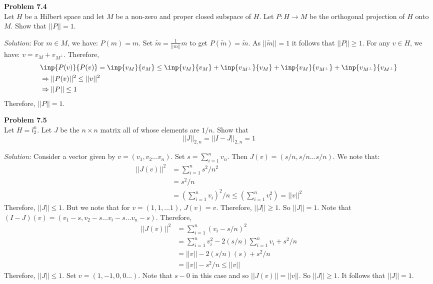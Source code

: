\documentclass[a4paper, 11pt]{article}
\newenvironment{problem}[2][Problem]
    { \begin{mdframed}[backgroundcolor=gray!20] \textbf{#1 #2} \\}
    {  \end{mdframed}}
\newenvironment{solution}
    {\textit{Solution:}}
    {}
\begin{document}
\begin{problem}{7.4}
    Let $H$ be a Hilbert space and let $M$ be a non-zero and proper closed subspace of $H$. Let $P:H\to M$ be the orthogonal projection of $H$ onto $M$. Show that $||P||=1$.
\end{problem}
\begin{solution}
    For $m\in M$, we have: $P(m)=m$. Set $\tilde m=\frac{1}{||m||}m$ to get $P(\tilde m)=\tilde m$. As $||\tilde m||=1$ it follows that $||P||\geq 1$. For any $v\in H$, we have: $v=v_{M}+v_{M^{\bot}}$. Therefore,
    \begin{align*}
        &\inp{P(v)}{P(v)}=\inp{v_M}{v_M}\leq\inp{v_M}{v_M}+\inp{v_{M^{\bot}}}{v_M}+\inp{v_{M}}{v_{M^\bot}}+\inp{v_{M^\bot}}{v_{M^\bot}}\\
        &\Rightarrow||P(v)||^2\leq ||v||^2\\
        &\Rightarrow||P||\leq 1
    \end{align*}
    Therefore, $||P||=1$. 
\end{solution}

\begin{problem}{7.5}
    Let $H=l_2^n$. Let $J$ be the $n\times n$ matrix all of whose elements are $1/n$. Show that 
    $$||J||_{2,n}=||I-J||_{2,n}=1$$
\end{problem}
\begin{solution}
 Consider a vector given by $v=(v_1,v_2\hdots v_n)$. Set $s=\sum_{i=1}^{n}v_n$. Then $J(v)=(s/n,s/n\hdots s/n)$. We note that:
 \begin{align*}
    ||J(v)||^2&=\displaystyle\sum_{i=1}^{n}s^2/n^2\\ 
    &=s^2/n\\
    &=\left(\sum_{i=1}^nv_i\right)^2/n\leq\left(\sum_{i=1}^nv_i^2\right)=||v||^2
 \end{align*}
 Therefore, $||J||\leq 1$. But we note that for $v=(1,1,\hdots1)$, $J(v)=v$. Therefore, $||J||\geq 1$. So $||J||=1$. Note that $(I-J)(v)=(v_1-s,v_2-s\hdots v_i-s\hdots v_n-s)$. Therefore,
 \begin{align*}
    ||J(v)||^2&=\sum_{i=1}^n(v_i-s/n)^2\\
    &=\sum_{i=1}^nv_i^2-2(s/n)\sum_{i=1}^nv_i+s^2/n\\
    &=||v||-2(s/n)(s)+s^2/n\\
    &=||v||-s^2/n\leq||v||
\end{align*}
Therefore, $||J||\leq 1$. Set $v=(1,-1,0,0\dots)$. Note that $s-0$ in this case and so $||J(v)||=||v||$. So $||J||\geq 1$. It follows that $||J||=1$. 
\end{solution}
\end{document}
